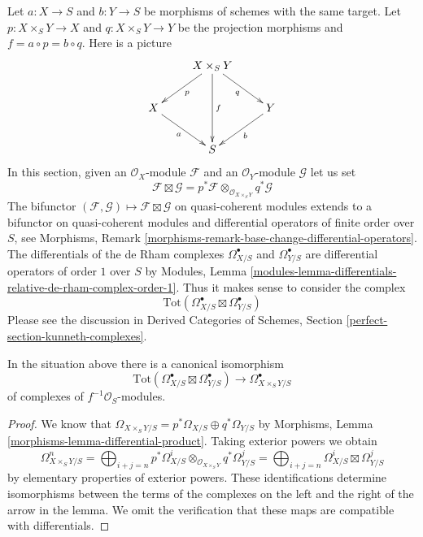 \medskip\noindent
Let $a : X \to S$ and $b : Y \to S$ be morphisms of schemes with the same
target. Let $p : X \times_S Y \to X$ and $q : X \times_S Y \to Y$ be the
projection morphisms and $f = a \circ p = b \circ q$. Here is a picture
$$
\xymatrix{
& X \times_S Y \ar[ld]^p \ar[rd]_q \ar[dd]^f \\
X \ar[rd]_a & & Y \ar[ld]^b \\
& S
}
$$
In this section, given an $\mathcal{O}_X$-module $\mathcal{F}$
and an $\mathcal{O}_Y$-module $\mathcal{G}$ let us set
$$
\mathcal{F} \boxtimes \mathcal{G} =
p^*\mathcal{F} \otimes_{\mathcal{O}_{X \times_S Y}} q^*\mathcal{G}
$$
The bifunctor
$(\mathcal{F}, \mathcal{G}) \mapsto \mathcal{F} \boxtimes \mathcal{G}$
on quasi-coherent modules extends to a bifunctor on quasi-coherent modules
and differential operators of finite order over $S$, see
Morphisms, Remark \ref{morphisms-remark-base-change-differential-operators}.
The differentials of the de Rham complexes $\Omega^\bullet_{X/S}$ and
$\Omega^\bullet_{Y/S}$ are differential operators of order $1$
over $S$ by Modules, Lemma
\ref{modules-lemma-differentials-relative-de-rham-complex-order-1}.
Thus it makes sense to consider the complex
$$
\text{Tot}(\Omega^\bullet_{X/S} \boxtimes \Omega^\bullet_{Y/S})
$$
Please see the discussion in Derived Categories of Schemes, Section
\ref{perfect-section-kunneth-complexes}.

\begin{lemma}
\label{lemma-de-rham-complex-product}
In the situation above there is a canonical isomorphism
$$
\text{Tot}(\Omega^\bullet_{X/S} \boxtimes \Omega^\bullet_{Y/S})
\longrightarrow
\Omega^\bullet_{X \times_S Y/S}
$$
of complexes of $f^{-1}\mathcal{O}_S$-modules.
\end{lemma}

\begin{proof}
We know that
$
\Omega_{X \times_S Y/S} = p^*\Omega_{X/S} \oplus q^*\Omega_{Y/S}
$
by Morphisms, Lemma \ref{morphisms-lemma-differential-product}.
Taking exterior powers we obtain
$$
\Omega^n_{X \times_S Y/S} =
\bigoplus\nolimits_{i + j = n}
p^*\Omega^i_{X/S} \otimes_{\mathcal{O}_{X \times_S Y}} q^*\Omega^j_{Y/S} =
\bigoplus\nolimits_{i + j = n}
\Omega^i_{X/S} \boxtimes \Omega^j_{Y/S}
$$
by elementary properties of exterior powers. These identifications determine
isomorphisms between the terms of the complexes on the left and the right
of the arrow in the lemma. We omit the verification that these maps
are compatible with differentials.
\end{proof}

